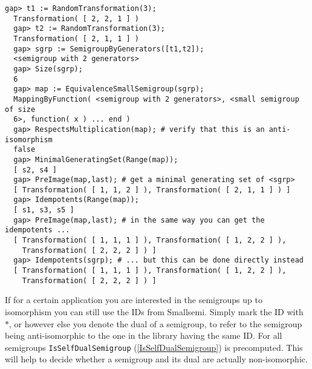 \documentclass[a4paper,11pt]{report}
\begin{document}
{{\begin{Verbatim}[fontsize=\small,frame=single,label=Example]
  gap> t1 := RandomTransformation(3);
  Transformation( [ 2, 2, 1 ] )
  gap> t2 := RandomTransformation(3);
  Transformation( [ 2, 1, 1 ] )
  gap> sgrp := SemigroupByGenerators([t1,t2]);
  <semigroup with 2 generators>
  gap> Size(sgrp);
  6
  gap> map := EquivalenceSmallSemigroup(sgrp); 
  MappingByFunction( <semigroup with 2 generators>, <small semigroup of size 
  6>, function( x ) ... end )
  gap> RespectsMultiplication(map); # verify that this is an anti-isomorphism
  false
  gap> MinimalGeneratingSet(Range(map));
  [ s2, s4 ]
  gap> PreImage(map,last); # get a minimal generating set of <sgrp>
  [ Transformation( [ 1, 1, 2 ] ), Transformation( [ 2, 1, 1 ] ) ]
  gap> Idempotents(Range(map));
  [ s1, s3, s5 ]
  gap> PreImage(map,last); # in the same way you can get the idempotents ...
  [ Transformation( [ 1, 1, 1 ] ), Transformation( [ 1, 2, 2 ] ), 
    Transformation( [ 2, 2, 2 ] ) ]
  gap> Idempotents(sgrp); # ... but this can be done directly instead 
  [ Transformation( [ 1, 1, 1 ] ), Transformation( [ 1, 2, 2 ] ), 
    Transformation( [ 2, 2, 2 ] ) ]
\end{Verbatim}
 If for a certain application you are interested in the semigroups up to
isomorphism you can still use the IDs from \textsf{Smallsemi}. Simply mark the ID with $*$, or however else you denote the dual of a semigroup, to refer to the
semigroup being anti-isomorphic to the one in the library having the same ID.
For all semigroups \texttt{IsSelfDualSemigroup} (\ref{IsSelfDualSemigroup}) is precomputed. This will help to decide whether a semigroup and its dual are
actually non-isomorphic. }

  }

  
\end{document}
